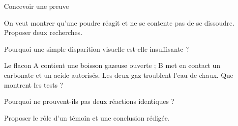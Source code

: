 \par\noindent\begin{minipage}{\linewidth}
\begin{exercice}[3]{Concevoir une preuve}
\begin{questions}
\item On veut montrer qu’une poudre réagit et ne se contente pas de se dissoudre. Proposer deux recherches.
\item Pourquoi une simple disparition visuelle est-elle insuffisante ?
\end{questions}
\end{exercice}
\end{minipage}
\label{defi-ex-6}
\begin{questions}
\item Le flacon A contient une boisson gazeuse ouverte ; B met en contact un carbonate et un acide autorisés. Les deux gaz troublent l’eau de chaux. Que montrent les tests ?
\item Pourquoi ne prouvent-ils pas deux réactions identiques ?
\item Proposer le rôle d’un témoin et une conclusion rédigée.
\end{questions}
\pcGrille
